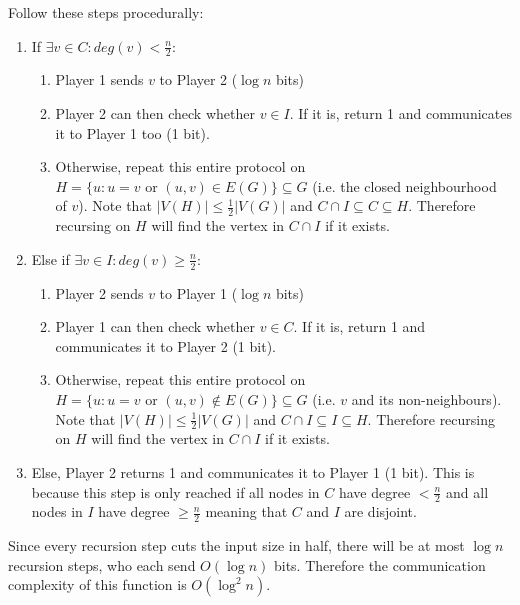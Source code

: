 \documentclass{article}
\newcommand{\pA}{Player 1 }
\newcommand{\pB}{Player 2 }
\begin{document}
Follow these steps procedurally: 
\begin{enumerate}
\item If $\exists v \in C : deg(v) < \frac{n}{2}$:
\begin{enumerate}
\item \pA sends $v$ to \pB ($\log n$ bits)
\item \pB can then check whether $v \in I$. If it is, return 1 and communicates it to \pA too (1 bit).
\item Otherwise, repeat this entire protocol on $H = \{u : u=v \text{ or } (u,v) \in E(G)\} \subseteq G$ (i.e. the closed neighbourhood of $v$). Note that $|V(H)|\leq \frac{1}{2}|V(G)|$ and $C \cap I \subseteq C \subseteq H$. Therefore recursing on $H$ will find the vertex in $C \cap I$ if it exists.
\end{enumerate}
\item Else if $\exists v \in I : deg(v) \geq \frac{n}{2}$:
\begin{enumerate}
\item \pB sends $v$ to \pA ($\log n$ bits)
\item \pA can then check whether $v \in C$. If it is, return 1 and communicates it to \pB (1 bit).
\item Otherwise, repeat this entire protocol on $H = \{u : u=v \text{ or } (u,v) \not\in E(G)\} \subseteq G$ (i.e. $v$ and its non-neighbours). Note that $|V(H)|\leq \frac{1}{2}|V(G)|$ and $C \cap I \subseteq I \subseteq H$. Therefore recursing on $H$ will find the vertex in $C \cap I$ if it exists.
\end{enumerate}
\item Else, \pB returns 1 and communicates it to \pA (1 bit). This is because this step is only reached if all nodes in $C$ have degree $<\frac{n}{2}$ and all nodes in $I$ have degree $\geq\frac{n}{2}$ meaning that $C$ and $I$ are disjoint.
\end{enumerate}

Since every recursion step cuts the input size in half, there will be at most $\log n$ recursion steps, who each send $O(\log n)$ bits. Therefore the communication complexity of this function is $O(\log^2 n)$.
\end{document}
